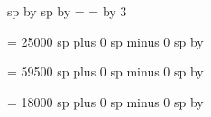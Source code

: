 %
%
%


\newcount\factor
{}


\newdimen\stafflineheight
{} sp 
\multiply\stafflineheight by \the\factor 
\newdimen\interstafflinespace
{} sp 
\multiply\interstafflinespace by \the\factor 
\newdimen\linewidth \linewidth=\hsize 
\newdimen\stafflinewidth \stafflinewidth=\linewidth 
\newdimen\staffheight {}\stafflineheight 
\advance\staffheight by 3\interstafflinespace

\newskip\spaceabovelines
\spaceabovelines = 25000 sp plus 0 sp minus 0 sp
\multiply\spaceabovelines by \factor

\newskip\spacelinestext
\spacelinestext = 59500 sp plus 0 sp minus 0 sp
\multiply\spacelinestext by \factor

\newskip\spacebeneathtext
\spacebeneathtext = 18000 sp plus 0 sp minus 0 sp
\multiply\spacebeneathtext by \factor

\newdimen\constantglyphraise %

